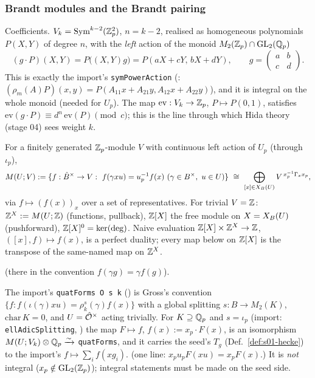 \subsubsection{Brandt modules and the Brandt pairing}

Coefficients. $V_k=\mathrm{Sym}^{k-2}(\mathbb{Z}_p^2)$, $n=k-2$, realised as homogeneous polynomials $P(X,Y)$ of degree $n$, with the
\emph{left} action of the monoid $M_2(\mathbb{Z}_p)\cap\mathrm{GL}_2(\mathbb{Q}_p)$
\begin{equation}\label{eq:s01-Vk}
(g\cdot P)(X,Y)=P\big((X,Y)g\big)=P(aX+cY,\,bX+dY),\qquad g=\left(\begin{smallmatrix}a&b\\c&d\end{smallmatrix}\right).
\end{equation}
This is exactly the import's \texttt{symPowerAction} (: $(\rho_m(A)P)(x,y)=P(A_{11}x+A_{21}y,A_{12}x+A_{22}y)$),
and it is integral on the whole monoid (needed for $U_p$). The map $\mathrm{ev}:V_k\to\mathbb{Z}_p$, $P\mapsto P(0,1)$, satisfies
$\mathrm{ev}(g\cdot P)\equiv d^n\,\mathrm{ev}(P)\pmod{c}$; this is the line through which Hida theory (stage 04) sees weight $k$.

\begin{definition}\label{def:s01-brandt}
For a finitely generated $\mathbb{Z}_p$-module $V$ with continuous left action of $U_p$ (through $\iota_p$),
\[\Brandt{U}{V}:=\{f:\Bhat^\times\to V:\ f(\gamma xu)=u_p^{-1}f(x)\ (\gamma\in B^\times,\ u\in U)\}\ \cong\ \bigoplus_{[x]\in\XB{U}}V^{\,x_p^{-1}\Gamma_xx_p},\]
via $f\mapsto(f(x))_x$ over a set of representatives. For trivial $V=\mathbb{Z}$: $\mathbb{Z}^X:=M(U;\mathbb{Z})$ (functions, pullback),
$\mathbb{Z}[X]$ the free module on $X=X_B(U)$ (pushforward), $\mathbb{Z}[X]^0=\ker(\deg)$. Naive evaluation $\mathbb{Z}[X]\times\mathbb{Z}^X\to\mathbb{Z}$,
$([x],f)\mapsto f(x)$, is a perfect duality; every map below on $\mathbb{Z}[X]$ is the transpose of the same-named map on $\mathbb{Z}^X$.
\end{definition}
\noindent\stknown{}  (there in the
convention $f(\gamma g)=\gamma f(g)$).

\begin{remark}\label{rem:s01-dictionary}
The import's \texttt{quatForms O s k} () is Gross's convention
$\{f:f(\iota(\gamma)xu)=\rho^s_k(\gamma)f(x)\}$ with a global splitting $s:B\to M_2(K)$, $\mathrm{char}\,K=0$, and $U=\hat{\mathcal{O}}^\times$
acting trivially. For $K\supseteq\mathbb{Q}_p$ and $s=\iota_p$ (import: \texttt{ellAdicSplitting}, ) the
map $F\mapsto f$, $f(x):=x_p\cdot F(x)$, is an isomorphism $M(U;V_k)\otimes\mathbb{Q}_p\xrightarrow{\sim}$ \texttt{quatForms}, and it
carries the seed's $T_g$ (Def.~\ref{def:s01-hecke}) to the import's $f\mapsto\sum_i f(xg_i)$. \sttoprove{} (one line:
$x_pu_pF(xu)=x_pF(x)$.) It is \emph{not} integral ($x_p\notin\mathrm{GL}_2(\mathbb{Z}_p)$); integral statements must be made on the seed side.
\end{remark}

